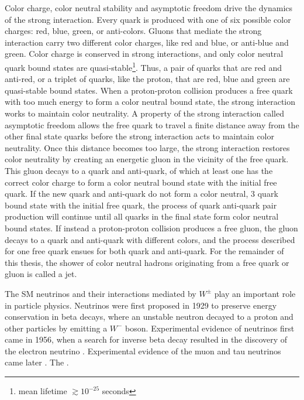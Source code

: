 Color charge, color neutral stability and asymptotic freedom drive the dynamics of the strong interaction.  
Every quark is produced with one of six possible color charges: red, blue, green, or anti-colors.  Gluons 
that mediate the strong interaction carry two different color charges, like red and blue, or anti-blue and 
green.  Color charge is conserved in strong interactions, and only color neutral quark bound states are 
quasi-stable\footnote{mean lifetime $\gtrsim 10^{-25}$ seconds}.  Thus, a pair of quarks that are red and 
anti-red, or a triplet of quarks, like the proton, that are red, blue and green are quasi-stable bound states.  
When a proton-proton collision produces a free quark with too much energy to form a color neutral bound state, 
the strong interaction works to maintain color neutrality.  A property of the strong interaction called 
asymptotic freedom allows the free quark to travel a finite distance away from the other final state quarks 
before the strong interaction acts to maintain color neutrality.  Once this distance becomes too large, the 
strong interaction restores color neutrality by creating an energetic gluon in the vicinity of the free quark.  This 
gluon decays to a quark and anti-quark, of which at least one has the correct color charge to 
form a color neutral bound state with the initial free quark.  If the new quark and anti-quark do not 
form a color neutral, 3 quark bound state with the initial free quark, the process of quark anti-quark 
pair production will continue until all quarks in the final state form color neutral bound states.  If 
instead a proton-proton collision produces a free gluon, the gluon decays to a quark and anti-quark with 
different colors, and the process described for one free quark ensues for both quark and anti-quark.  For 
the remainder of this thesis, the shower of color neutral hadrons originating from a free quark or gluon is 
called a jet.

The SM neutrinos and their interactions mediated by $W^{\pm}$ play an important role in particle physics.  
Neutrinos were first proposed in 1929 to preserve energy conservation in beta decays, where an unstable 
neutron decayed to a proton and other particles by emitting a $W^{-}$ boson.  Experimental evidence of 
neutrinos first came in 1956, when a search for inverse beta decay resulted in the discovery of the electron 
neutrino \cite{firstNuDiscovery}.  Experimental evidence of the muon and tau neutrinos came later \cite{muNuDiscovery,tauNuDiscovery}.  
The .




